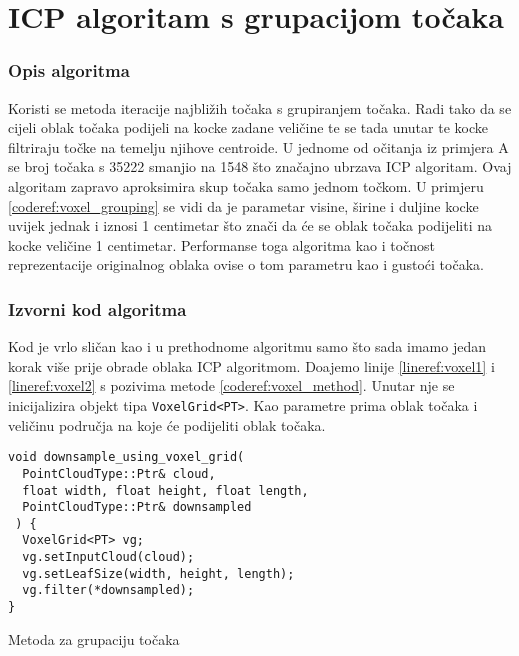 \section{ICP algoritam s grupacijom točaka}

\subsubsection{Opis algoritma}
Koristi se metoda iteracije najbližih točaka s grupiranjem točaka\cite{pcl:voxelgrid}. Radi tako da se cijeli oblak točaka podijeli na kocke zadane veličine te se tada unutar te kocke filtriraju točke na temelju njihove centroide\cite{wiki:Centroid}. U jednome od očitanja iz primjera A se broj točaka s 35222 smanjio na 1548 što značajno ubrzava ICP algoritam. Ovaj algoritam zapravo aproksimira skup točaka samo jednom točkom. U primjeru \ref{coderef:voxel_grouping} se vidi da je parametar visine, širine i duljine kocke uvijek jednak i iznosi 1 centimetar što znači da će se oblak točaka podijeliti na kocke veličine 1 centimetar. Performanse toga algoritma kao i točnost reprezentacije originalnog oblaka ovise o tom parametru kao i gustoći točaka.


\subsubsection{Izvorni kod algoritma}
Kod je vrlo sličan kao i u prethodnome algoritmu samo što sada imamo jedan korak više prije obrade oblaka ICP algoritmom. Doajemo linije \ref{lineref:voxel1} i \ref{lineref:voxel2} s pozivima metode \ref{coderef:voxel_method}. Unutar nje se inicijalizira objekt tipa \texttt{VoxelGrid<PT>}. Kao parametre prima oblak točaka i veličinu područja na koje će podijeliti oblak točaka.

\begin{listing}[H]
  \begin{verbatim}
void downsample_using_voxel_grid(
  PointCloudType::Ptr& cloud,
  float width, float height, float length,
  PointCloudType::Ptr& downsampled
 ) {
  VoxelGrid<PT> vg;
  vg.setInputCloud(cloud);
  vg.setLeafSize(width, height, length);
  vg.filter(*downsampled);
}
  \end{verbatim}
  \caption{Metoda za grupaciju točaka}
  \label{coderef:voxel_method}
\end{listing}

